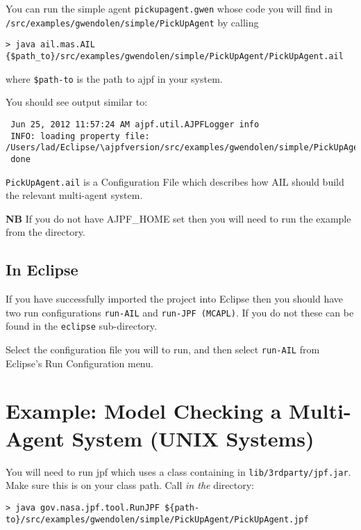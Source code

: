 You can run the simple agent \texttt{pickupagent.gwen} whose code you will find in \texttt{/src/examples/gwendolen/simple/PickUpAgent} by calling

\noindent \begin{lstlisting}[basicstyle=\tiny]
> java ail.mas.AIL {$path_to}/src/examples/gwendolen/simple/PickUpAgent/PickUpAgent.ail
\end{lstlisting}
\medskip

\noindent where \texttt{\${path-to}} is the path to ajpf in your system.

You should see output similar to:

\noindent \begin{lstlisting}
 Jun 25, 2012 11:57:24 AM ajpf.util.AJPFLogger info
 INFO: loading property file: /Users/lad/Eclipse/\ajpfversion/src/examples/gwendolen/simple/PickUpAgent/PickUpAgent.ail
 done
\end{lstlisting}
\medskip
 
\texttt{PickUpAgent.ail} is a Configuration File which describes how AIL should build the relevant multi-agent system.

{\bf NB}  If you do not have AJPF\_HOME set then you will need to run the example from the \texttt{\ajpfversion} directory.

\subsection{In Eclipse}

If you have successfully imported the project into Eclipse then you should have two run configurations \texttt{run-AIL} and \texttt{run-JPF (MCAPL)}.  If you do not these can be found in the \texttt{eclipse} sub-directory.

Select the configuration file you will to run, and then select \texttt{run-AIL} from Eclipse's Run Configuration menu.


\section{Example: Model Checking a Multi-Agent System (UNIX Systems)}

You will need to run jpf which uses a class containing in \texttt{lib/3rdparty/jpf.jar}.  Make sure this is on your class path.  Call \emph{in the \ajpfversion} directory:

\noindent \begin{lstlisting}[basicstyle=\tiny]
> java gov.nasa.jpf.tool.RunJPF ${path-to}/src/examples/gwendolen/simple/PickUpAgent/PickUpAgent.jpf
\end{lstlisting}
\medskip

